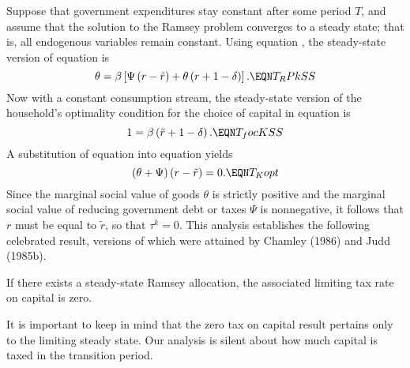 Suppose that government expenditures stay constant after some period $T$,
and assume that the solution to the Ramsey problem converges to a steady
state; that is, all endogenous variables remain constant.
Using equation , the steady-state version of equation 
is
$$
\theta = \beta\left[ \Psi \left(r - \tilde r\right)
  + \theta \left(r + 1-\delta \right)\right].         \EQN T_RPkSS
$$
Now with a constant consumption stream,
 the steady-state version of the household's
optimality condition for the choice of capital in equation  is
$$
1 = \beta \left(\tilde r +1-\delta \right).   \EQN T_focKSS
$$
A substitution of equation   into equation  yields
$$
\left(\theta + \Psi \right) (r-\tilde r) = 0.     \EQN T_Kopt
$$
Since the marginal social value of goods $\theta$ is strictly positive
and the marginal social value of reducing government debt or taxes
$\Psi$ is nonnegative, it follows that $r$ must be equal to $\tilde r$,
so that $\tau^k=0$. This  analysis
establishes the following celebrated result,
versions of which were attained by Chamley (1986) and Judd (1985b).
 

\medskip
\medskip{} If there exists a steady-state Ramsey allocation,
the associated limiting tax rate on capital is zero.

\medskip

It is important to keep in mind that the zero tax on capital result pertains only to
the limiting steady state. Our analysis is silent about how much
capital is taxed in the transition period.


